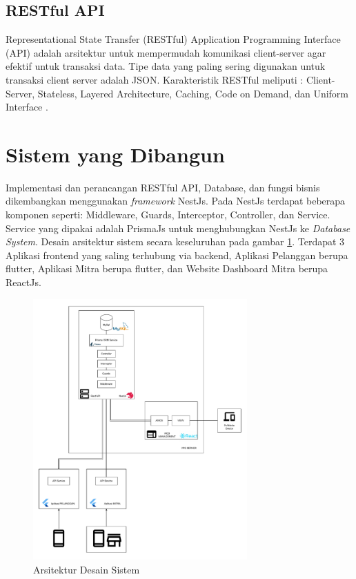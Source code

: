 \subsection{RESTful API}
Representational State Transfer (RESTful) Application Programming Interface (API) adalah arsitektur untuk mempermudah komunikasi client-server agar efektif untuk transaksi data. Tipe data yang paling sering digunakan untuk transaksi client server adalah JSON. Karakteristik RESTful meliputi : Client-Server, Stateless, Layered Architecture, Caching, Code on Demand, dan Uniform Interface \cite{giessler2015best}.

\newpage
\section{Sistem yang Dibangun}

Implementasi dan perancangan RESTful API, Database, dan fungsi bisnis dikembangkan menggunakan \textit{framework} NestJs. Pada NestJs terdapat beberapa komponen seperti: Middleware, Guards, Interceptor, Controller, dan Service. Service yang dipakai adalah PrismaJs untuk menghubungkan NestJs ke \textit{Database System}. Desain arsitektur sistem secara keseluruhan pada gambar \ref{sistem-desain-arsitektur}. Terdapat 3 Aplikasi frontend yang saling terhubung via backend, Aplikasi Pelanggan berupa flutter, Aplikasi Mitra berupa flutter, dan Website Dashboard Mitra berupa ReactJs.
\begin{figure}[h]
	\centering
	\includegraphics[width=0.73\textwidth]{drawio/System-Design-Architecture.drawio.pdf}
	\caption{Arsitektur Desain Sistem}
	\label{sistem-desain-arsitektur}
\end{figure}
\newpage
